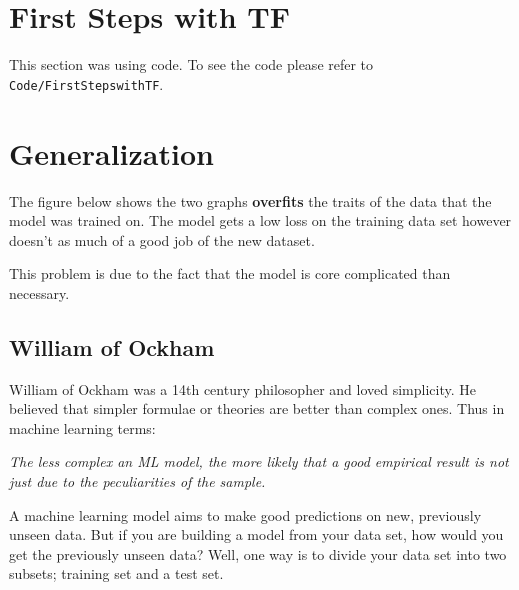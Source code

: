 \documentclass[12pt]{article}
\begin{document}
\section{First Steps with TF}
This section was using code. To see the code please refer to {\tt{Code/FirstStepswithTF}}.
\section{Generalization}
The figure below shows the two graphs \textbf{overfits} the traits of the data that the model was trained on. The model gets a low loss on the training data set however doesn't as much of a good job of the new dataset.
\begin{figure}[h]%
    \centering
    \qquad
    \caption{}%
\end{figure}

This problem is due to the fact that the model is core complicated than necessary.

\subsection{William of Ockham}
William of Ockham was a 14th century philosopher and loved simplicity. He believed that simpler formulae or theories are better than complex ones. Thus in machine learning terms:
\begin{center}
	\textit{The less complex an ML model, the more likely that a good empirical result is not just due to the peculiarities of the sample.}
\end{center}
A machine learning model aims to make good predictions on new, previously unseen data. But if you are building a model from your data set, how would you get the previously unseen data? Well, one way is to divide your data set into two subsets; training set and a test set.
\end{document}
